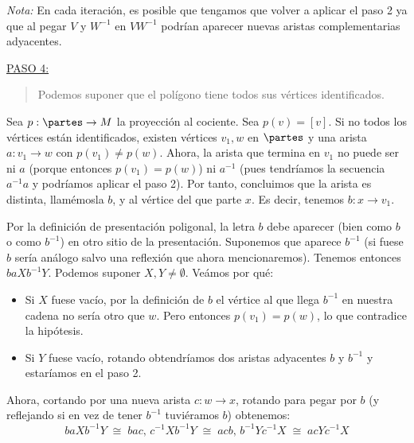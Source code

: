 {    \vspace{0.5em}
    \noindent
    \textit{Nota:} En cada iteración, es posible que tengamos que volver a aplicar el paso 2 ya que al pegar $V$ y $W^{-1}$ en $VW^{-1}$ podrían aparecer nuevas aristas complementarias adyacentes.

    \vspace{1.3em}
    \noindent
    \underline{PASO 4:}
    \begin{quote}
        Podemos suponer que el polígono tiene todos sus vértices identificados.
    \end{quote}

    \noindent
    Sea $p:\partes \to M$ la proyección al cociente. Sea $p(v)=[v]$. 
    Si no todos los vértices están identificados, existen vértices $v_1, w$ en $\partes$ 
    y una arista $ a : v_1 \to w$ con $p(v_1)\ne p(w)$. 
    Ahora, la arista que termina en $v_1$ no puede ser ni $a$ (porque entonces $p(v_1) = p(w)$) 
    ni $a^{-1}$ (pues tendríamos la secuencia $a^{-1} a$ y podríamos aplicar el paso 2). 
    Por tanto, concluimos que la arista es distinta, llamémosla $b$, y al vértice del que parte $x$. 
    Es decir, tenemos $b : x \to v_1$.

    \vspace{0.5em}
    \noindent
    Por la definición de presentación poligonal, la letra $b$ debe aparecer (bien como $b$ o como $b^{-1}$) en otro sitio de la presentación. 
    Suponemos que aparece $b^{-1}$ (si fuese $b$ sería análogo salvo una reflexión que ahora mencionaremos). 
    Tenemos entonces $baXb^{-1}Y$. Podemos suponer $X,Y \ne \emptyset$. Veámos por qué:
    \begin{itemize}
        \item Si $X$ fuese vacío, por la definición de $b$ el vértice al que llega $b^{-1}$ en nuestra cadena no sería otro que $w$. 
              Pero entonces $p(v_1) = p(w)$, lo que contradice la hipótesis.
        \item Si $Y$ fuese vacío, rotando obtendríamos dos aristas adyacentes $b$ y $b^{-1}$ y estaríamos en el paso 2.
    \end{itemize}

    \vspace{0.5em}
    \noindent
    Ahora, cortando por una nueva arista $c : w \to x$, rotando para pegar por $b$ 
    (y reflejando si en vez de tener $b^{-1}$ tuviéramos $b$) obtenemos:
    \[
        baXb^{-1}Y \;\cong\; bac \text{, } c^{-1}Xb^{-1}Y \;\cong\; acb \text{, } b^{-1}Yc^{-1}X \;\cong\; acYc^{-1}X
    \]

}
